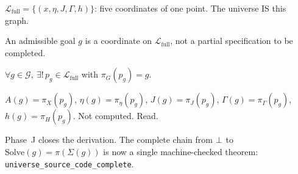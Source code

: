 \begin{theorem}
\label{thm:step43}
$\mathcal{L}_{\mathrm{full}} = \{(x, \eta, J, \Gamma, h)\}$: five
coordinates of one point.  The universe IS this graph.
\end{theorem}

\begin{theorem}
\label{thm:step44}
An admissible goal $g$ is a coordinate on $\mathcal{L}_{\mathrm{full}}$,
not a partial specification to be completed.
\end{theorem}

\begin{theorem}
\label{thm:step45}
$\forall g \in \mathcal{G},\ \exists!\, p_g \in
\mathcal{L}_{\mathrm{full}}$ with $\pi_G(p_g) = g$.
\end{theorem}

\begin{theorem}
\label{thm:step46}
$A(g) = \pi_X(p_g)$, $\eta(g) = \pi_\eta(p_g)$,
$J(g) = \pi_J(p_g)$, $\Gamma(g) = \pi_\Gamma(p_g)$,
$h(g) = \pi_H(p_g)$.  Not computed.  Read.
\end{theorem}

\noindent
Phase~J closes the derivation.  The complete chain from $\bot$ to
$\mathrm{Solve}(g) = \pi(\Sigma(g))$ is now a single machine-checked
theorem: \texttt{universe\_source\_code\_complete}.









